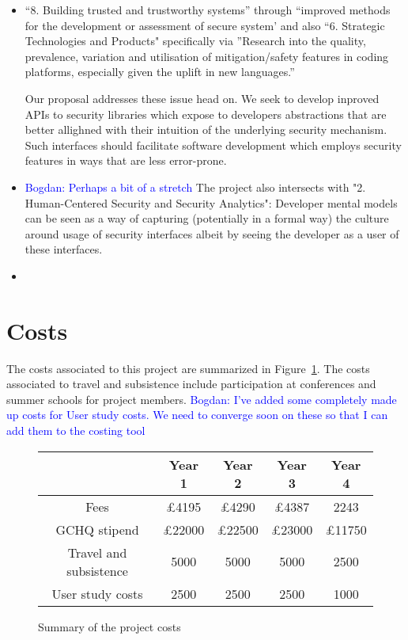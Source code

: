 \documentclass[10pt]{article}
\newcommand{\bw}[1]{{\textcolor{blue} {Bogdan: #1}}}
\begin{document}
\begin{itemize}
\item ``8. Building trusted and trustworthy systems'' through ``improved methods for the development or assessment of secure system' and also 
``6. Strategic Technologies and Products" specifically via ''Research into the quality, prevalence, variation and utilisation of mitigation/safety features in coding platforms, especially given the uplift in new languages.'' 

Our proposal addresses these issue head on. We seek to develop inproved APIs to security libraries which expose to developers abstractions that are better allighned with their intuition of the underlying security mechanism.  Such interfaces should facilitate software development which employs security features in ways that are less error-prone. 
\item \bw{Perhaps a bit of a stretch} The project also intersects with  "2. Human-Centered Security and Security Analytics": Developer mental models can be seen as a way of capturing (potentially in a formal way) the culture around usage of security interfaces albeit by seeing the developer as a user of these interfaces. 
\item 
\end{itemize} 








 


\section{Costs}
The costs associated to this project are summarized in Figure~\ref{fig:costs}.  
The costs associated to travel and subsistence include participation at conferences and summer schools for project members.
\bw{I've added some completely made up costs for User study costs. We need to converge soon on these so that I can add them to the costing tool}
\begin{figure}[h!t]
\begin{center}
\begin{tabular}{|c|c|c|c|c|}
\hline 
& {\bf Year 1} &{\bf Year 2}&{\bf Year 3}&{\bf Year 4}\\
\hline
Fees & £4195 & £4290 & £4387 & 2243 \\
\hline
GCHQ stipend & £22000 & £22500 & £23000 & £11750 \\
\hline
Travel and subsistence & 5000 & 5000 & 5000 & 2500 \\
\hline
User study costs & 2500 & 2500 & 2500 & 1000 \\
\hline
\end{tabular}
\end{center}
\caption{Summary of the project costs}
\label{fig:costs}
\end{figure}

%
%
%
%
\small


\end{document}
